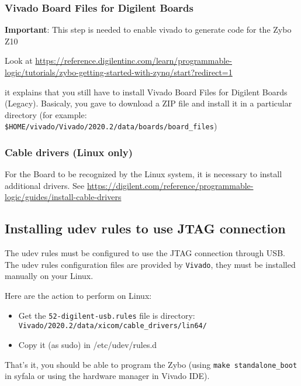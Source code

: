 \subsubsection{Vivado Board Files for Digilent Boards}
{\bf Important}: This step is needed to enable vivado to generate code for the Zybo Z10

Look at \url{https://reference.digilentinc.com/learn/programmable-logic/tutorials/zybo-getting-started-with-zynq/start?redirect=1}

it explains that you still have to install Vivado Board Files for Digilent Boards (Legacy). Basicaly, you gave to download a ZIP file and install it in a particular directory
(for example: \verb#$HOME/vivado/Vivado/2020.2/data/boards/board_files#)

\subsubsection{Cable drivers (Linux only)}
For the Board to be recognized by the Linux system, it is necessary to install additional drivers. See \url{https://digilent.com/reference/programmable-logic/guides/install-cable-drivers}



\subsection{Installing udev rules to use JTAG connection}
\label{sec-udev}
The udev rules must be configured to use the JTAG connection through USB. The udev rules configuration files are provided by {\tt Vivado}, they must be installed manually on your Linux.

Here are the action to perform on Linux:
\begin{itemize}
\item Get the {\tt 52-digilent-usb.rules} file is directory:\\
  {\tt Vivado/2020.2/data/xicom/cable\_drivers/lin64/}
\item Copy it (as sudo) in /etc/udev/rules.d
\end{itemize}
That's it, you should be able to program the Zybo (using {\tt make standalone\_boot} in syfala or using the hardware manager in Vivado IDE). 

